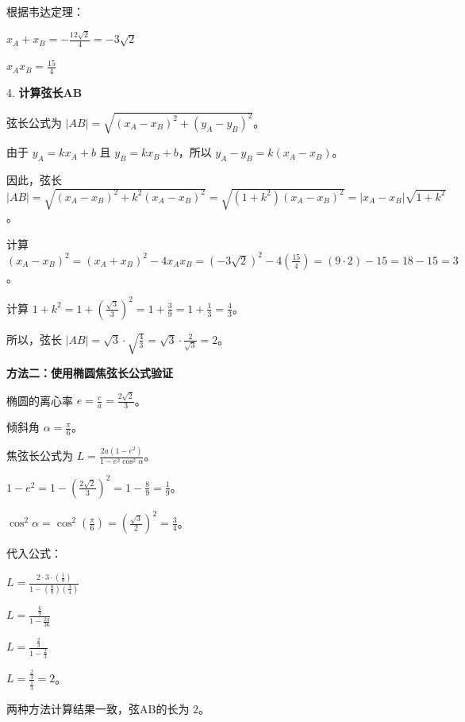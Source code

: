 \documentclass[varwidth=16cm, border=2mm]{standalone}
\begin{document}
{根据韦达定理：

$x_A + x_B = -\frac{12\sqrt{2}}{4} = -3\sqrt{2}$

$x_A x_B = \frac{15}{4}$



4. \textbf{计算弦长AB}

弦长公式为 $|AB| = \sqrt{(x_A - x_B)^2 + (y_A - y_B)^2}$。

由于 $y_A = kx_A + b$ 且 $y_B = kx_B + b$，所以 $y_A - y_B = k(x_A - x_B)$。

因此，弦长 $|AB| = \sqrt{(x_A - x_B)^2 + k^2(x_A - x_B)^2} = \sqrt{(1+k^2)(x_A - x_B)^2} = |x_A - x_B|\sqrt{1+k^2}$。

计算 $(x_A - x_B)^2 = (x_A + x_B)^2 - 4x_A x_B = (-3\sqrt{2})^2 - 4(\frac{15}{4}) = (9 \cdot 2) - 15 = 18 - 15 = 3$。

计算 $1+k^2 = 1 + (\frac{\sqrt{3}}{3})^2 = 1 + \frac{3}{9} = 1 + \frac{1}{3} = \frac{4}{3}$。

所以，弦长 $|AB| = \sqrt{3} \cdot \sqrt{\frac{4}{3}} = \sqrt{3} \cdot \frac{2}{\sqrt{3}} = 2$。



\textbf{方法二：使用椭圆焦弦长公式验证}

椭圆的离心率 $e = \frac{c}{a} = \frac{2\sqrt{2}}{3}$。

倾斜角 $\alpha = \frac{\pi}{6}$。

焦弦长公式为 $L = \frac{2a(1-e^2)}{1-e^2\cos^2\alpha}$。

$1-e^2 = 1 - (\frac{2\sqrt{2}}{3})^2 = 1 - \frac{8}{9} = \frac{1}{9}$。

$\cos^2\alpha = \cos^2(\frac{\pi}{6}) = (\frac{\sqrt{3}}{2})^2 = \frac{3}{4}$。

代入公式：

$L = \frac{2 \cdot 3 \cdot (\frac{1}{9})}{1 - (\frac{8}{9}) (\frac{3}{4})}$

$L = \frac{\frac{6}{9}}{1 - \frac{24}{36}}$

$L = \frac{\frac{2}{3}}{1 - \frac{2}{3}}$

$L = \frac{\frac{2}{3}}{\frac{1}{3}} = 2$。



两种方法计算结果一致，弦AB的长为 $2$。}
\end{document}
